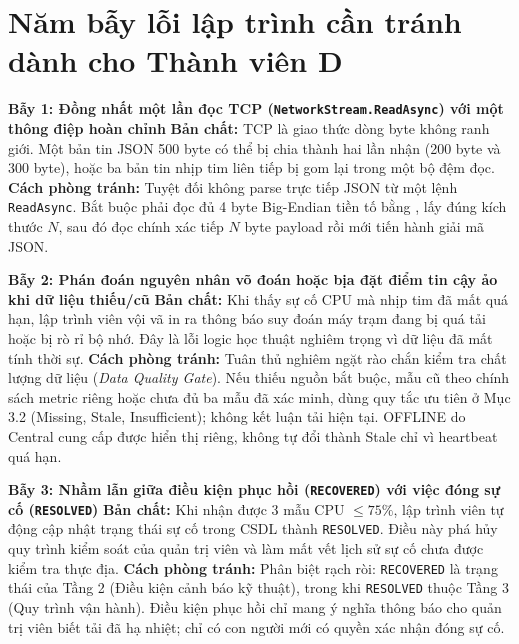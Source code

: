 \documentclass[12pt,a4paper]{article}
\begin{document}
\section{Năm bẫy lỗi lập trình cần tránh dành cho Thành viên D}

\begin{pitfallbox}
\textbf{Bẫy 1: Đồng nhất một lần đọc TCP (\texttt{NetworkStream.ReadAsync}) với một thông điệp hoàn chỉnh}
\newline \textbf{Bản chất:} TCP là giao thức dòng byte không ranh giới. Một bản tin JSON 500 byte có thể bị chia thành hai lần nhận (200 byte và 300 byte), hoặc ba bản tin nhịp tim liên tiếp bị gom lại trong một bộ đệm đọc.
\newline \textbf{Cách phòng tránh:} Tuyệt đối không parse trực tiếp JSON từ một lệnh \texttt{ReadAsync}. Bắt buộc phải đọc đủ 4 byte Big-Endian tiền tố bằng , lấy đúng kích thước $N$, sau đó đọc chính xác tiếp $N$ byte payload rồi mới tiến hành giải mã JSON.
\end{pitfallbox}

\begin{pitfallbox}
\textbf{Bẫy 2: Phán đoán nguyên nhân võ đoán hoặc bịa đặt điểm tin cậy ảo khi dữ liệu thiếu/cũ}
\newline \textbf{Bản chất:} Khi thấy sự cố CPU mà nhịp tim đã mất quá hạn, lập trình viên vội vã in ra thông báo suy đoán máy trạm đang bị quá tải hoặc bị rò rỉ bộ nhớ. Đây là lỗi logic học thuật nghiêm trọng vì dữ liệu đã mất tính thời sự.
\newline \textbf{Cách phòng tránh:} Tuân thủ nghiêm ngặt rào chắn kiểm tra chất lượng dữ liệu (\textit{Data Quality Gate}). Nếu thiếu nguồn bắt buộc, mẫu cũ theo chính sách metric riêng hoặc chưa đủ ba mẫu đã xác minh, dùng quy tắc ưu tiên ở Mục 3.2 (Missing, Stale, Insufficient); không kết luận tải hiện tại. OFFLINE do Central cung cấp được hiển thị riêng, không tự đổi thành Stale chỉ vì heartbeat quá hạn.
\end{pitfallbox}

\begin{pitfallbox}
\textbf{Bẫy 3: Nhầm lẫn giữa điều kiện phục hồi (\texttt{RECOVERED}) với việc đóng sự cố (\texttt{RESOLVED})}
\newline \textbf{Bản chất:} Khi nhận được 3 mẫu CPU $\le 75\%$, lập trình viên tự động cập nhật trạng thái sự cố trong CSDL thành \texttt{RESOLVED}. Điều này phá hủy quy trình kiểm soát của quản trị viên và làm mất vết lịch sử sự cố chưa được kiểm tra thực địa.
\newline \textbf{Cách phòng tránh:} Phân biệt rạch ròi: \texttt{RECOVERED} là trạng thái của Tầng 2 (Điều kiện cảnh báo kỹ thuật), trong khi \texttt{RESOLVED} thuộc Tầng 3 (Quy trình vận hành). Điều kiện phục hồi chỉ mang ý nghĩa thông báo cho quản trị viên biết tải đã hạ nhiệt; chỉ có con người mới có quyền xác nhận đóng sự cố.
\end{pitfallbox}
\end{document}

